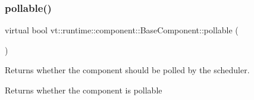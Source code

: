 \mbox{\label{structvt_1_1runtime_1_1component_1_1_base_component_ab651a49e6d4d3d8ca9e82a6b4b10af66}} 
\subsubsection{\texorpdfstring{pollable()}{pollable()}}
{\footnotesize\ttfamily virtual bool vt\+::runtime\+::component\+::\+Base\+Component\+::pollable (\begin{DoxyParamCaption}{ }\end{DoxyParamCaption})\hspace{0.3cm}{\ttfamily [pure virtual]}}



Returns whether the component should be polled by the scheduler. 

\begin{DoxyReturn}{Returns}
whether the component is pollable 
\end{DoxyReturn}


